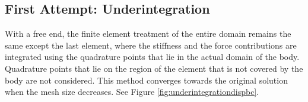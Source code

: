 \documentclass[a4paper,12pt]{article}
\makeatletter
\newenvironment{figurehere}
  {\def\@captype{figure}}
  {}
\makeatother
\begin{document}
\subsection{First Attempt: Underintegration}
With a free end, the finite element treatment of the entire domain remains the same except the last element, where the stiffness and the force contributions are integrated using the quadrature points that lie in the actual domain of the body. Quadrature points that lie on the region of the element that is not covered by the body are not considered. This method converges towards the original solution when the mesh size decreases. See Figure \ref{fig:underintegrationdispbc}.\\
\begin{center}
\begin{figurehere}
\\

\end{figurehere}
\end{center}
\end{document}
